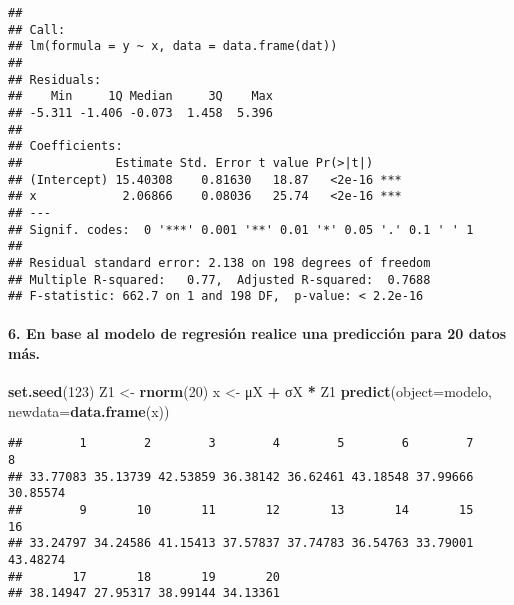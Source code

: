 \documentclass[
]{article}
\newenvironment{Shaded}{\begin{snugshade}}{\end{snugshade}}
\newcommand{\AttributeTok}[1]{\textcolor[rgb]{0.13,0.29,0.53}{#1}}
\newcommand{\DecValTok}[1]{\textcolor[rgb]{0.00,0.00,0.81}{#1}}
\newcommand{\FunctionTok}[1]{\textcolor[rgb]{0.13,0.29,0.53}{\textbf{#1}}}
\newcommand{\NormalTok}[1]{#1}
\newcommand{\OtherTok}[1]{\textcolor[rgb]{0.56,0.35,0.01}{#1}}
\newcommand{\SpecialCharTok}[1]{\textcolor[rgb]{0.81,0.36,0.00}{\textbf{#1}}}
\begin{document}
\begin{verbatim}
## 
## Call:
## lm(formula = y ~ x, data = data.frame(dat))
## 
## Residuals:
##    Min     1Q Median     3Q    Max 
## -5.311 -1.406 -0.073  1.458  5.396 
## 
## Coefficients:
##             Estimate Std. Error t value Pr(>|t|)    
## (Intercept) 15.40308    0.81630   18.87   <2e-16 ***
## x            2.06866    0.08036   25.74   <2e-16 ***
## ---
## Signif. codes:  0 '***' 0.001 '**' 0.01 '*' 0.05 '.' 0.1 ' ' 1
## 
## Residual standard error: 2.138 on 198 degrees of freedom
## Multiple R-squared:   0.77,  Adjusted R-squared:  0.7688 
## F-statistic: 662.7 on 1 and 198 DF,  p-value: < 2.2e-16
\end{verbatim}

\hypertarget{en-base-al-modelo-de-regresiuxf3n-realice-una-predicciuxf3n-para-20-datos-muxe1s.}{%
\paragraph{6. En base al modelo de regresión realice una predicción para
20 datos
más.}\label{en-base-al-modelo-de-regresiuxf3n-realice-una-predicciuxf3n-para-20-datos-muxe1s.}}

\begin{Shaded}
\begin{Highlighting}[]
\FunctionTok{set.seed}\NormalTok{(}\DecValTok{123}\NormalTok{)}
\NormalTok{Z1 }\OtherTok{\textless{}{-}} \FunctionTok{rnorm}\NormalTok{(}\DecValTok{20}\NormalTok{)}
\NormalTok{x }\OtherTok{\textless{}{-}}\NormalTok{ μX }\SpecialCharTok{+}\NormalTok{ σX }\SpecialCharTok{*}\NormalTok{ Z1}
\FunctionTok{predict}\NormalTok{(}\AttributeTok{object=}\NormalTok{modelo, }\AttributeTok{newdata=}\FunctionTok{data.frame}\NormalTok{(x))}
\end{Highlighting}
\end{Shaded}

\begin{verbatim}
##        1        2        3        4        5        6        7        8 
## 33.77083 35.13739 42.53859 36.38142 36.62461 43.18548 37.99666 30.85574 
##        9       10       11       12       13       14       15       16 
## 33.24797 34.24586 41.15413 37.57837 37.74783 36.54763 33.79001 43.48274 
##       17       18       19       20 
## 38.14947 27.95317 38.99144 34.13361
\end{verbatim}
\end{document}
